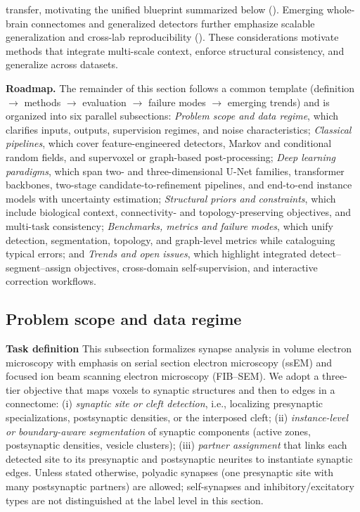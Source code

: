 transfer, motivating the unified blueprint summarized below (\cite{Svara2022Zebrafish,Chen2023AdaSyn,Chen2024DualChannel,Liu2024InstanceSeg}). Emerging whole-brain connectomes and generalized detectors further emphasize scalable generalization and cross-lab reproducibility (\cite{Yu2025NewSynapse,Mohinta2025SimpSyn}). These considerations motivate methods that integrate multi-scale context, enforce structural consistency, and generalize across datasets.

\noindent\textbf{Roadmap.} The remainder of this section follows a common template (definition $\rightarrow$ methods $\rightarrow$ evaluation $\rightarrow$ failure modes $\rightarrow$ emerging trends) and is organized into six parallel subsections: \emph{Problem scope and data regime}, which clarifies inputs, outputs, supervision regimes, and noise characteristics; \emph{Classical pipelines}, which cover feature-engineered detectors, Markov and conditional random fields, and supervoxel or graph-based post-processing; \emph{Deep learning paradigms}, which span two- and three-dimensional U-Net families, transformer backbones, two-stage candidate-to-refinement pipelines, and end-to-end instance models with uncertainty estimation; \emph{Structural priors and constraints}, which include biological context, connectivity- and topology-preserving objectives, and multi-task consistency; \emph{Benchmarks, metrics and failure modes}, which unify detection, segmentation, topology, and graph-level metrics while cataloguing typical errors; and \emph{Trends and open issues}, which highlight integrated detect–segment–assign objectives, cross-domain self-supervision, and interactive correction workflows.

\subsection{Problem scope and data regime}

\noindent\textbf{Task definition}\;
This subsection formalizes synapse analysis in volume electron microscopy with emphasis on serial section electron microscopy (ssEM) and focused ion beam scanning electron microscopy (FIB--SEM). We adopt a three-tier objective that maps voxels to synaptic structures and then to edges in a connectome:
(i) \emph{synaptic site or cleft detection}, i.e., localizing presynaptic specializations, postsynaptic densities, or the interposed cleft;
(ii) \emph{instance-level or boundary-aware segmentation} of synaptic components (active zones, postsynaptic densities, vesicle clusters);
(iii) \emph{partner assignment} that links each detected site to its presynaptic and postsynaptic neurites to instantiate synaptic edges.
Unless stated otherwise, polyadic synapses (one presynaptic site with many postsynaptic partners) are allowed; self-synapses and inhibitory/excitatory types are not distinguished at the label level in this section.\par

